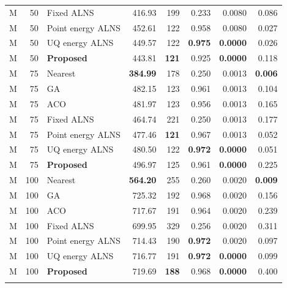 \begin{longtable}{@{}rrlrrrrr@{}}
M & 50 & Fixed ALNS & 416.93 & 199 & 0.233 & 0.0080 & 0.086 \\

M & 50 & Point energy ALNS & 452.61 & 122 & 0.958 & 0.0080 & 0.027 \\

M & 50 & UQ energy ALNS & 449.57 & 122 & \textbf{0.975} & \textbf{0.0000} & 0.026 \\
\rowcolor{gray!10}
M & 50 & \textbf{Proposed} & 443.81 & \textbf{121} & 0.925 & \textbf{0.0000} & 0.118 \\
\addlinespace[2pt]

M & 75 & Nearest & \textbf{384.99} & 178 & 0.250 & 0.0013 & \textbf{0.006} \\

M & 75 & GA & 482.15 & 123 & 0.961 & 0.0013 & 0.104 \\

M & 75 & ACO & 481.97 & 123 & 0.956 & 0.0013 & 0.165 \\

M & 75 & Fixed ALNS & 464.74 & 221 & 0.250 & 0.0013 & 0.177 \\

M & 75 & Point energy ALNS & 477.46 & \textbf{121} & 0.967 & 0.0013 & 0.052 \\

M & 75 & UQ energy ALNS & 480.50 & 122 & \textbf{0.972} & \textbf{0.0000} & 0.051 \\
\rowcolor{gray!10}
M & 75 & \textbf{Proposed} & 496.97 & 125 & 0.961 & \textbf{0.0000} & 0.225 \\
\addlinespace[2pt]

M & 100 & Nearest & \textbf{564.20} & 255 & 0.260 & 0.0020 & \textbf{0.009} \\

M & 100 & GA & 725.32 & 192 & 0.968 & 0.0020 & 0.156 \\

M & 100 & ACO & 717.67 & 191 & 0.964 & 0.0020 & 0.239 \\

M & 100 & Fixed ALNS & 699.95 & 329 & 0.256 & 0.0020 & 0.311 \\

M & 100 & Point energy ALNS & 714.43 & 190 & \textbf{0.972} & 0.0020 & 0.097 \\

M & 100 & UQ energy ALNS & 716.77 & 191 & \textbf{0.972} & \textbf{0.0000} & 0.099 \\
\rowcolor{gray!10}
M & 100 & \textbf{Proposed} & 719.69 & \textbf{188} & 0.968 & \textbf{0.0000} & 0.400 \\
\addlinespace[2pt]


\end{longtable}
